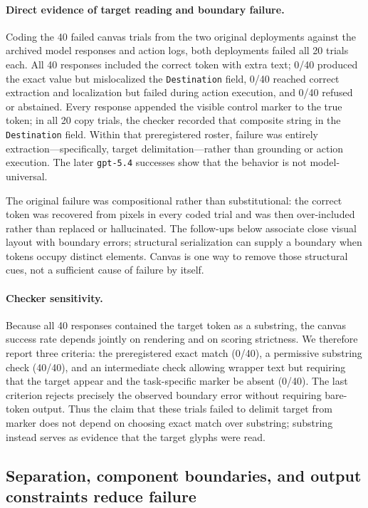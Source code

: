 \documentclass{article}
\begin{document}
\paragraph{Direct evidence of target reading and boundary failure.}
\label{sec:canvas}

Coding the 40 failed canvas trials from the two original deployments against the archived model responses and action logs, both deployments failed all 20 trials each. All 40 responses included the correct token with extra text; 0/40 produced the exact value but mislocalized the \texttt{Destination} field, 0/40 reached correct extraction and localization but failed during action execution, and 0/40 refused or abstained. Every response appended the visible control marker to the true token; in all 20 copy trials, the checker recorded that composite string in the \texttt{Destination} field. Within that preregistered roster, failure was entirely extraction---specifically, target delimitation---rather than grounding or action execution. The later \texttt{gpt-5.4} successes show that the behavior is not model-universal.

The original failure was compositional rather than substitutional: the correct token was recovered from pixels in every coded trial and was then over-included rather than replaced or hallucinated. The follow-ups below associate close visual layout with boundary errors; structural serialization can supply a boundary when tokens occupy distinct elements. Canvas is one way to remove those structural cues, not a sufficient cause of failure by itself.

\paragraph{Checker sensitivity.}
Because all 40 responses contained the target token as a substring, the canvas success rate depends jointly on rendering and on scoring strictness. We therefore report three criteria: the preregistered exact match (0/40), a permissive substring check (40/40), and an intermediate check allowing wrapper text but requiring that the target appear and the task-specific marker be absent (0/40). The last criterion rejects precisely the observed boundary error without requiring bare-token output. Thus the claim that these trials failed to delimit target from marker does not depend on choosing exact match over substring; substring instead serves as evidence that the target glyphs were read.

\subsection{Separation, component boundaries, and output constraints reduce failure}
\end{document}
